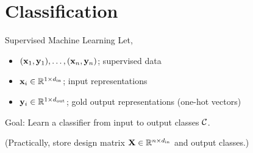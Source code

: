 \documentclass{beamer}
\begin{document}





\section{Classification}


\begin{frame}{Supervised Machine Learning}
  Let, 
  \begin{itemize}
  \item $(\mathbf{x}_1, \mathbf{y}_1), \ldots, (\mathbf{x}_n, \mathbf{y}_n)$; supervised data
  \item $\mathbf{x}_i \in \mathbb{R}^{1 \times {d_{\mathrm{in}}}}$;  input representations  
  \item $\mathbf{y}_i \in \mathbb{R}^{1 \times {d_{\mathrm{out}}}}$; gold output representations (one-hot vectors)
  \end{itemize}

  Goal: Learn a classifier from input to output classes $\mathcal{C}$.  

  \air
  \air

  (Practically, store design matrix $\mathbf{X} \in \mathbb{R}^{n
    \times {d_{\mathrm{in}}}}$ and output classes.)
\end{frame}
\end{document}
